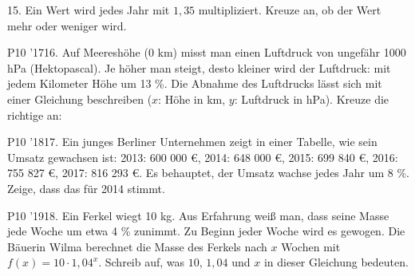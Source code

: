 \documentclass[11pt]{article}
\begin{document}
\pfgruppe{}
\begin{pfaufg}{}{15.}{}
Ein Wert wird jedes Jahr mit $1{,}35$ multipliziert. Kreuze an, ob der Wert mehr oder weniger wird. 
\end{pfaufg}
\pfgruppe{}
\begin{pfaufg}{P10 ’17}{\llap{\textasteriskcentered\,}16.}{}
Auf Meereshöhe (0 km) misst man einen Luftdruck von ungefähr 1000 hPa (Hektopascal). Je höher man steigt, desto kleiner wird der Luftdruck: mit jedem Kilometer Höhe um 13 \%. Die Abnahme des Luftdrucks lässt sich mit einer Gleichung beschreiben ($x$: Höhe in km, $y$: Luftdruck in hPa). Kreuze die richtige an:
\par\smallskip\noindent {}\par
{}
\end{pfaufg}
\pfgruppe{}
\begin{pfaufg}{P10 ’18}{17.}{}
Ein junges Berliner Unternehmen zeigt in einer Tabelle, wie sein Umsatz gewachsen ist: 2013: 600 000 €, 2014: 648 000 €, 2015: 699 840 €, 2016: 755 827 €, 2017: 816 293 €. Es behauptet, der Umsatz wachse jedes Jahr um 8 \%. Zeige, dass das für 2014 stimmt.
\par\smallskip\noindent {}\par
{}
\end{pfaufg}
\begin{pfaufg}{P10 ’19}{\llap{\textasteriskcentered\,}18.}{}
Ein Ferkel wiegt 10 kg. Aus Erfahrung weiß man, dass seine Masse jede Woche um etwa 4 \% zunimmt. Zu Beginn jeder Woche wird es gewogen. Die Bäuerin Wilma berechnet die Masse des Ferkels nach $x$ Wochen mit $f(x) = 10 \cdot 1{,}04^x$. Schreib auf, was $10$, $1{,}04$ und $x$ in dieser Gleichung bedeuten.
\par\smallskip\noindent {}\par
{}
\end{pfaufg}
\end{document}
